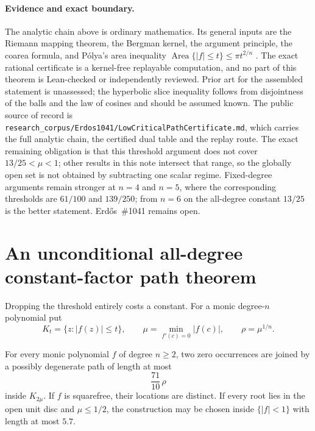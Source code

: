 \documentclass[11pt]{article}
\begin{document}
\paragraph{Evidence and exact boundary.}
\label{bdry:low-critical-closure}
The analytic chain above is ordinary mathematics.  Its general inputs are the
Riemann mapping theorem, the Bergman kernel, the argument principle, the
coarea formula, and P\'olya's area inequality
$\operatorname{Area}\{|f|\le t\}\le\pi t^{2/n}$
\cite[printed pp.~280--282]{polya1928}.  The exact rational certificate is a
kernel-free replayable computation, and no part of this theorem is
Lean-checked or independently reviewed.  Prior art for the assembled statement
is unassessed; the hyperbolic slice inequality follows from disjointness of
the balls and the law of cosines and should be assumed known.  The public
source of record is
\texttt{research\_corpus/Erdos1041/LowCriticalPathCertificate.md}, which
carries the full analytic chain, the certified dual table and the replay
route.  The exact remaining obligation is that this threshold argument does
not cover $13/25<\mu<1$; other results in this note intersect that range, so
the globally open set is not obtained by subtracting one scalar regime.
Fixed-degree arguments remain stronger at $n=4$ and $n=5$, where the
corresponding thresholds are $61/100$ and $139/250$; from $n=6$ on the
all-degree constant $13/25$ is the better statement.  Erd\H{o}s~\#1041 remains
open.

\section{An unconditional all-degree constant-factor path theorem}
\label{sec:constant-factor}

Dropping the threshold entirely costs a constant.  For a monic degree-$n$
polynomial put
\[
 K_t=\{z:|f(z)|\le t\},\qquad
 \mu=\min_{f'(c)=0}|f(c)|,\qquad \rho=\mu^{1/n}.
\]

\begin{theorem}
\label{res:constant-factor-path}
For every monic polynomial $f$ of degree $n\ge2$, two zero occurrences are
joined by a possibly degenerate path of length at most
\[
 \frac{71}{10}\,\rho
\]
inside $K_{2\mu}$.  If $f$ is squarefree, their locations are distinct.
If every root lies in the open unit disc and $\mu\le1/2$, the construction
may be chosen inside $\{|f|<1\}$ with length at most $5.7$.
\end{theorem}
\end{document}

